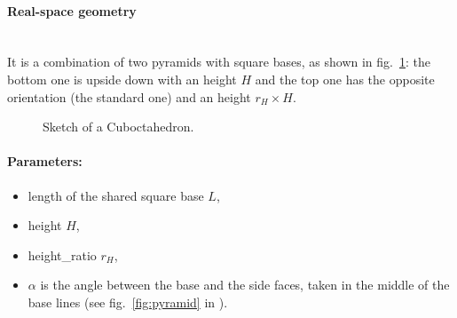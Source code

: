 \paragraph{Real-space geometry}\mbox{}\\
It is a combination of two pyramids with square bases, as shown in fig.~\ref{fig:cuboctahedron}: the bottom one
is upside down with an height $H$ and the top one has the opposite
orientation (the standard one) and an height $r_H \times H$.

\begin{figure}[ht]
\hfill
{}
\hfill
{}
\hfill
\caption{Sketch of a Cuboctahedron.}
\label{fig:cuboctahedron}
\end{figure}

\FloatBarrier

\paragraph{Parameters:}
\begin{itemize}
\item length of the shared square base $L$,
\item height $H$,
\item height\_ratio $r_H$,
\item $\alpha$ is the angle between the base and the
  side faces, taken in the middle of the base lines (see
  fig.~\ref{fig:pyramid} in ).
\end{itemize}

